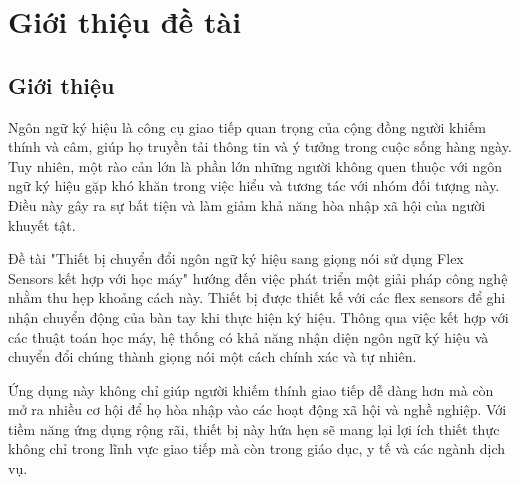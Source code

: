 \section{Giới thiệu đề tài}
\subsection{Giới thiệu}
\indent Ngôn ngữ ký hiệu là công cụ giao tiếp quan trọng của cộng đồng người khiếm thính và câm, giúp họ truyền tải thông tin và ý tưởng trong cuộc sống hàng ngày. Tuy nhiên, một rào cản lớn là phần lớn những người không quen thuộc với ngôn ngữ ký hiệu gặp khó khăn trong việc hiểu và tương tác với nhóm đối tượng này. Điều này gây ra sự bất tiện và làm giảm khả năng hòa nhập xã hội của người khuyết tật.

\indent Đề tài "Thiết bị chuyển đổi ngôn ngữ ký hiệu sang giọng nói sử dụng Flex Sensors kết hợp với học máy" hướng đến việc phát triển một giải pháp công nghệ nhằm thu hẹp khoảng cách này. Thiết bị được thiết kế với các flex sensors để ghi nhận chuyển động của bàn tay khi thực hiện ký hiệu. Thông qua việc kết hợp với các thuật toán học máy, hệ thống có khả năng nhận diện ngôn ngữ ký hiệu và chuyển đổi chúng thành giọng nói một cách chính xác và tự nhiên.

\indent Ứng dụng này không chỉ giúp người khiếm thính giao tiếp dễ dàng hơn mà còn mở ra nhiều cơ hội để họ hòa nhập vào các hoạt động xã hội và nghề nghiệp. Với tiềm năng ứng dụng rộng rãi, thiết bị này hứa hẹn sẽ mang lại lợi ích thiết thực không chỉ trong lĩnh vực giao tiếp mà còn trong giáo dục, y tế và các ngành dịch vụ.
